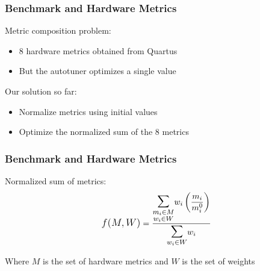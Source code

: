 \documentclass[10pt, compress, xcolor={table,xcdraw,usenames}, aspectratio=169]{beamer}
\begin{document}
\begin{frame}
    \frametitle{Benchmark and Hardware Metrics}
    \begin{block}{\alert{Metric composition} problem:}
        \begin{itemize}
            \item \alert{8 hardware metrics} obtained from Quartus
            \item But the autotuner optimizes \alert{a single value}
        \end{itemize}
    \end{block}

    \pause

    \begin{block}{Our \alert{solution} so far:}
        \begin{itemize}
            \item \alert{Normalize} metrics using initial values
            \item Optimize the \alert{normalized sum} of the 8 metrics
        \end{itemize}
    \end{block}
\end{frame}

\begin{frame}
    \frametitle{Benchmark and Hardware Metrics}
    \begin{block}{\alert{Normalized sum} of metrics:}
        \begin{align*} \label{eq:wnsm}
            \mathlarger{f(M, W)} = \frac{\mathlarger{\mathlarger{\mathlarger{\sum}}}\limits_{\substack{m_i \in M \\ w_i \in W}}{w_i\left(\dfrac{m_i}{m_{i}^{0}}\right)}}{\mathlarger{\mathlarger{\mathlarger{\sum}}}\limits_{w_i \in W}{w_i}}
        \end{align*}

        \begin{center}
            Where $M$ is the set of \alert{hardware metrics} and $W$ is the set
            of \alert{weights}
        \end{center}
    \end{block}
\end{frame}
\end{document}
